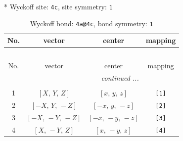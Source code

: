 \documentclass[fleqn,8pt]{jsarticle}
\begin{document}
* Wyckoff site: {\tt 4c}, site symmetry: {\tt 1}
\renewcommand{\arraystretch}{1.2}
\begin{longtable}{cccc}
\caption{Wyckoff bond: {\tt 4a@4c}, bond symmetry: {\tt 1}}
 \\
 \hline \hline
No. & vector & center & mapping \\ \hline \endfirsthead

\multicolumn{3}{l}{\tablename\ \thetable{}} \\
 \hline \hline
No. & vector & center & mapping \\ \hline \endhead

 \hline \hline
\multicolumn{3}{r}{\footnotesize\it continued ...} \\ \endfoot

 \hline \hline
\multicolumn{3}{r}{} \\ \endlastfoot

1 & $\left[ X,\, Y,\, Z \right]$ & $\left[ x,\, y,\, z \right]$ & {\tt [1]} \\ \hline
2 & $\left[ - X,\, Y,\, - Z \right]$ & $\left[ - x,\, y,\, - z \right]$ & {\tt [2]} \\ \hline
3 & $\left[ - X,\, - Y,\, - Z \right]$ & $\left[ - x,\, - y,\, - z \right]$ & {\tt [3]} \\ \hline
4 & $\left[ X,\, - Y,\, Z \right]$ & $\left[ x,\, - y,\, z \right]$ & {\tt [4]} \\
\end{longtable}
\end{document}
